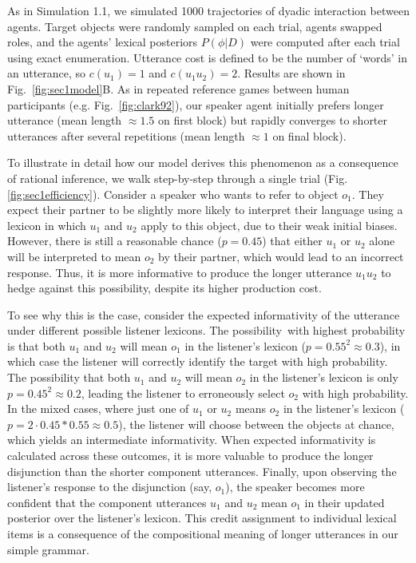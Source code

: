 As in Simulation 1.1, we simulated 1000 trajectories of dyadic interaction between agents.
Target objects were randomly sampled on each trial, agents swapped roles, and the agents' lexical posteriors $P(\phi | D)$ were computed after each trial using exact enumeration. 
Utterance cost is defined to be the number of `words' in an utterance, so $c(u_1) =1$ and $c(u_1u_2)=2$.
Results are shown in Fig.~\ref{fig:sec1model}B.
As in repeated reference games between human participants (e.g. Fig.~\ref{fig:clark92}), our speaker agent initially prefers longer utterance (mean length $\approx 1.5$ on first block) but rapidly converges to shorter utterances after several repetitions (mean length $\approx 1$ on final block).

To illustrate in detail how our model derives this phenomenon as a consequence of rational inference, we walk step-by-step through a single trial (Fig. \ref{fig:sec1efficiency}).
Consider a speaker who wants to refer to object $o_1$. 
They expect their partner to be slightly more likely to interpret their language using a lexicon in which $u_{1}$ and $u_{2}$ apply to this object, due to their weak initial biases. 
However, there is still a reasonable chance ($p=0.45$) that either $u_1$ or $u_2$ alone will be interpreted to mean $o_2$ by their partner, which would lead to an incorrect response. 
Thus, it is more informative to produce the longer utterance $u_{1}u_{2}$ to hedge against this possibility, despite its higher production cost. 

To see why this is the case, consider the expected informativity of the utterance under different possible listener lexicons.
The possibility with highest probability is that both $u_1$ and $u_2$ will mean $o_1$ in the listener's lexicon ($p = 0.55^2 \approx 0.3$), in which case the listener will correctly identify the target with high probability.
The possibility that both $u_1$ and $u_2$ will mean $o_2$ in the listener's lexicon is only $p=0.45^2 \approx 0.2$, leading the listener to erroneously select $o_2$ with high probability. 
In the mixed cases, where just one of $u_1$ or $u_2$ means $o_2$ in the listener's lexicon ($p = 2 \cdot 0.45 * 0.55 \approx 0.5$), the listener will choose between the objects at chance, which yields an intermediate informativity.
When expected informativity is calculated across these outcomes, it is more valuable to produce the longer disjunction than the shorter component utterances.
Finally, upon observing the listener's response to the disjunction (say, $o_1$), the speaker becomes more confident that the component utterances $u_1$ and $u_2$ mean $o_1$ in their updated posterior over the listener's lexicon.
This credit assignment to individual lexical items is a consequence of the compositional meaning of longer utterances in our simple grammar.

